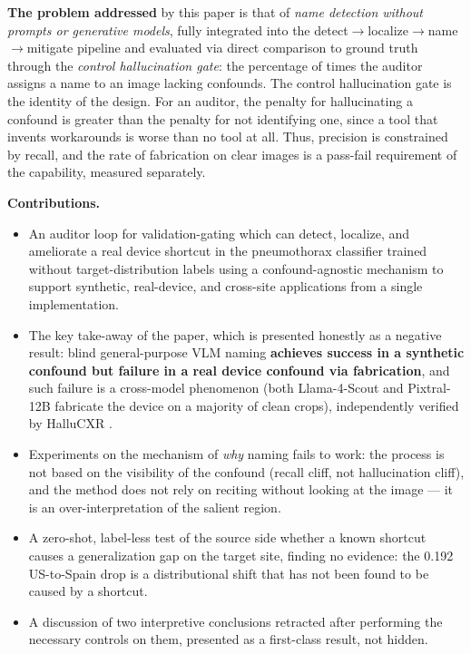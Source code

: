 \documentclass{ieeeaccess}
\newcommand{\arw}{$\rightarrow$}
\begin{document}
\textbf{The problem addressed} by this paper is that of \emph{name detection without prompts or generative models}, fully integrated into the detect\arw{}localize\arw{}name\arw{}mitigate pipeline and evaluated via direct comparison to ground truth through the \emph{control hallucination gate}: the percentage of times the auditor assigns a name to an image lacking confounds. The control hallucination gate is the identity of the design. For an auditor, the penalty for hallucinating a confound is greater than the penalty for not identifying one, since a tool that invents workarounds is worse than no tool at all. Thus, precision is constrained by recall, and the rate of fabrication on clear images is a pass-fail requirement of the capability, measured separately.

\textbf{Contributions.}
\begin{itemize}
\item An auditor loop for validation-gating which can detect, localize, and ameliorate a real device shortcut in the pneumothorax classifier trained without target-distribution labels using a confound-agnostic mechanism to support synthetic, real-device, and cross-site applications from a single implementation.
\item The key take-away of the paper, which is presented honestly as a negative result: blind general-purpose VLM naming \textbf{achieves success in a synthetic confound but failure in a real device confound via fabrication}, and such failure is a cross-model phenomenon (both Llama-4-Scout and Pixtral-12B fabricate the device on a majority of clean crops), independently verified by HalluCXR \cite{hallucxr}.
\item Experiments on the mechanism of \emph{why} naming fails to work: the process is not based on the visibility of the confound (recall cliff, not hallucination cliff), and the method does not rely on reciting without looking at the image --- it is an over-interpretation of the salient region.
\item A zero-shot, label-less test of the source side whether a known shortcut causes a generalization gap on the target site, finding no evidence: the 0.192 US-to-Spain drop is a distributional shift that has not been found to be caused by a shortcut.
\item A discussion of two interpretive conclusions retracted after performing the necessary controls on them, presented as a first-class result, not hidden.
\end{itemize}
\end{document}
